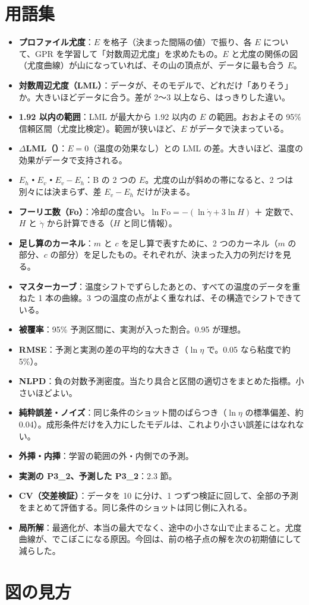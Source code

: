 \documentclass[paper=a4paper,fontsize=10.5pt,line_length=44zw,number_of_lines=38]{jlreq}
\newcommand{\file}[1]{\texttt{\detokenize{#1}}}
\newcommand{\gd}{\dot{\gamma}}
\newcommand{\Eh}{E_{h}}
\newcommand{\Ev}{E_{v}}
\newcommand{\PII}{P3\_2}
\newenvironment{termlist}{\begin{itemize}[label=・,leftmargin=1\zw,labelwidth=1\zw,labelsep=0pt,itemsep=0.4ex,topsep=0.6ex,parsep=0pt]}{\end{itemize}}
\newcommand{\term}[1]{\item \textbf{#1}：}
\begin{document}
\section{用語集}
\begin{termlist}
\term{プロファイル尤度}$E$ を格子（決まった間隔の値）で振り、各 $E$ について、GPR を学習して「対数周辺尤度」を求めたもの。$E$ と尤度の関係の図（尤度曲線）が山になっていれば、その山の頂点が、データに最も合う $E$。
\term{対数周辺尤度（LML）}データが、そのモデルで、どれだけ「ありそう」か。大きいほどデータに合う。差が 2〜3 以上なら、はっきりした違い。
\term{1.92 以内の範囲}LML が最大から 1.92 以内の $E$ の範囲。おおよその 95\% 信頼区間（尤度比検定）。範囲が狭いほど、$E$ がデータで決まっている。
\term{$\Delta$LML（\file{dLML_vs_E0}）}$E=0$（温度の効果なし）との LML の差。大きいほど、温度の効果がデータで支持される。
\term{$\Eh$・$\Ev$・$E_v-E_h$}B の 2 つの $E$。尤度の山が斜めの帯になると、2 つは別々には決まらず、差 $E_v-E_h$ だけが決まる。
\term{フーリエ数（Fo）}冷却の度合い。$\ln\mathrm{Fo}=-(\ln\gd+3\ln H)$ ＋ 定数で、$H$ と $\gd$ から計算できる（$H$ と同じ情報）。
\term{足し算のカーネル}$m$ と $c$ を足し算で表すために、2 つのカーネル（$m$ の部分、$c$ の部分）を足したもの。それぞれが、決まった入力の列だけを見る。
\term{マスターカーブ}温度シフトでずらしたあとの、すべての温度のデータを重ねた 1 本の曲線。3 つの温度の点がよく重なれば、その構造でシフトできている。
\term{被覆率}95\% 予測区間に、実測が入った割合。0.95 が理想。
\term{RMSE}予測と実測の差の平均的な大きさ（$\ln\eta$ で。0.05 なら粘度で約 5\%）。
\term{NLPD}負の対数予測密度。当たり具合と区間の適切さをまとめた指標。小さいほどよい。
\term{純粋誤差・ノイズ}同じ条件のショット間のばらつき（$\ln\eta$ の標準偏差、約 0.04）。成形条件だけを入力にしたモデルは、これより小さい誤差にはなれない。
\term{外挿・内挿}学習の範囲の外・内側での予測。
\term{実測の \PII、予測した \PII}2.3 節。
\term{CV（交差検証）}データを 10 に分け、1 つずつ検証に回して、全部の予測をまとめて評価する。同じ条件のショットは同じ側に入れる。
\term{局所解}最適化が、本当の最大でなく、途中の小さな山で止まること。尤度曲線が、でこぼこになる原因。今回は、前の格子点の解を次の初期値にして減らした。
\end{termlist}

\section{図の見方}
\end{document}
